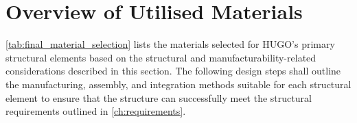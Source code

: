 \section{Overview of Utilised Materials}
\label{sec:final_utilised_materials}
\autoref{tab:final_material_selection} lists the materials selected for HUGO's primary structural elements based on the structural and manufacturability-related considerations described in this section. The following design steps shall outline the manufacturing, assembly, and integration methods suitable for each structural element to ensure that the structure can successfully meet the structural requirements outlined in \autoref{ch:requirements}.

